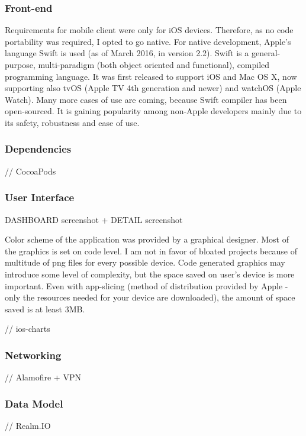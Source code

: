 \subsubsection{Front-end}
Requirements for mobile client were only for iOS devices. Therefore, as no code portability was required, I opted to go native. For native development, Apple's language Swift is used (as of March 2016, in version 2.2). Swift is a general-purpose, multi-paradigm (both object oriented and functional), compiled programming language. It was first released to support iOS and Mac OS X, now supporting also tvOS (Apple TV 4th generation and newer) and watchOS (Apple Watch). Many more cases of use are coming, because Swift compiler has been open-sourced. It is gaining popularity among non-Apple developers mainly due to its safety, robustness and ease of use.

\subsubsection*{Dependencies}

// CocoaPods

\subsubsection*{User Interface}

DASHBOARD screenshot + DETAIL screenshot

Color scheme of the application was provided by a graphical designer. Most of the graphics is set on code level. I am not in favor of bloated projects because of multitude of png files for every possible device. Code generated graphics may introduce some level of complexity, but the space saved on user's device is more important. Even with app-slicing (method of distribution provided by Apple - only the resources needed for your device are downloaded), the amount of space saved is at least 3MB.

// ios-charts

\subsubsection*{Networking}

// Alamofire + VPN

\subsubsection*{Data Model}

// Realm.IO
